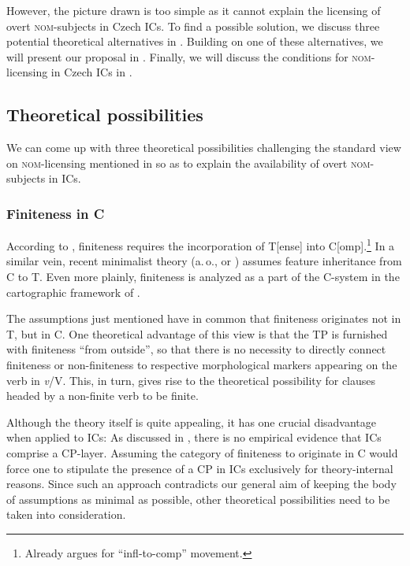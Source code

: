 \documentclass[output=paper,colorlinks,citecolor=brown,
modfonts,newtxmath
]{langscibook}
\begin{document}
\noindent However, the picture drawn is too simple as it cannot explain the licensing of overt \textsc{nom}-subjects in Czech ICs. To find a possible solution, we discuss three potential theoretical alternatives in . Building on one of these alternatives, we will present our proposal in . Finally, we will discuss the conditions for \textsc{nom}-licensing in Czech ICs in .


\subsection{Theoretical possibilities}\label{sec:nom_possibilities}

We can come up with three theoretical possibilities challenging the standard view on \textsc{nom}-licensing mentioned in  so as to explain the availability of overt \textsc{nom}-subjects in ICs.

\subsubsection{Finiteness in C}\label{sec:nom_possibilities_1}

According to \citet{Kayne1994}, finiteness requires the incorporation of T[ense] into C[omp].\footnote{Already \citet{Raposo1987} argues for ``infl-to-comp'' movement.} In a similar vein, recent minimalist theory (a.\,o., \citealt{Chomsky2007} or \citealt{Richards2007}) assumes feature inheritance from C to T. Even more plainly, finite\-ness is analyzed as a part of the C-system in the cartographic framework of \citet{Rizzi1997}. 

The assumptions just mentioned have in common that finiteness originates not in T, but in C. One theoretical advantage of this view is that the TP is furnished with finiteness ``from outside'', so that there is no necessity to directly connect finiteness or non-finiteness to respective morphological markers appearing on the verb in \textit{v}/V. This, in turn, gives rise to the theoretical possibility for clauses headed by a non-finite verb to be finite.

Although the theory itself is quite appealing, it has one crucial disadvantage when applied to ICs: As discussed in , there is no empirical evidence that ICs comprise a CP-layer. Assuming the category of finiteness to originate in C would force one to stipulate the presence of a CP in ICs exclusively for theory-internal reasons. Since such an approach contradicts our general aim of keeping the body of assumptions as minimal as possible, other theoretical possibilities need to be taken into consideration.
\end{document}
